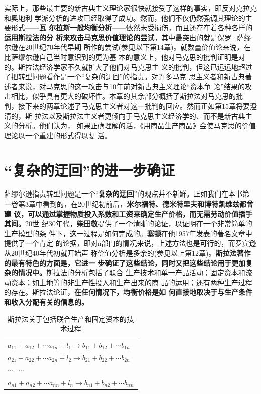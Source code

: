 实际上，那些最主要的新古典主义理论家很快就接受了这样的事实，即反对克拉克和奥地利
学派分析的进攻已经取得了成功。然而，他们不仅仍然强调其理论的主要形式——\textbf{瓦
  尔拉斯一般均衡分析}——依然未受损伤，而且还存在着各种各样的\textbf{运用斯拉法的分
  析来攻击马克思价值理论的尝试}，其中最突出的就是保罗·萨缪尔逊在20世纪70年代早期
所作的尝试(参见以下第14章)。就数量价值论来说，在比萨缪尔逊自己当时意识到的更为基
本的意义上，他对马克思的批判证明是对的。斯拉法经济学家不久就扩大了他们对马克思主
义的批判，但这已远远地超过了把转型问题看作是一个“复杂的迂回”的指责。对许多马克
思主义者和新古典著述者来说，对马克思的这一攻击与10年前对新古典主义理论“资本争
论”结果的攻击相比，似乎具有更大的破坏性。本章的其余部分概括了斯拉法对马克思的批
判，接下来的两章论述了马克思主义者对这一批判的回应。然而正如第15章将要澄清的，斯
拉法以及斯拉法主义者更倾向于马克思主义经济学的、而不是新古典主义的分析。他们认为，
如果正确理解的话，《用商品生产商品》会使马克思的价值理论以一个重建的形式得以复
活。

\section{“复杂的迂回”的进一步确证}

萨缪尔逊指责转型问题是一个“\textbf{复杂的迂回}”的观点并不新鲜。正如我们在本书第
一卷第3章中看到的，在20世纪初前后，\textbf{米尔福特、德米特里夫和博特凯维兹都曾建
  议，可以通过掌握物质投入系数和工资来确定生产价格，而无需劳动价值插手其间。}20世
纪30年代，\textbf{柴田敬}提供了一个清晰的论证，以证明在一个非常简单的生产模型的条
件下，这一过程是如何完成的。\textbf{塞顿}在他1957年发表的著名文章中提供了一个肯定
的论据，即对n部门的情况来说，上述方法也是可行的，而罗宾逊从20世纪40年代初就开始声
称价值分析是多余的(参见以上第12章)。\textbf{斯拉法著作的最有特色的方面是，它进一
  步确证了这些结论，同时又把这些结论用于更加复杂的情况中。}斯拉法的分析包括了联合
生产技术和单一产品活动；固定资本和流动资本；如土地等的非生产性投入和生产出来的商
品的运用；还有两种生产过程的存在。斯拉法论证，\textbf{在任何情况下，均衡价格是如
  何直接地取决于与生产条件和收入分配有关的信息的。}

\begin{table}[htbp]
\centering
\caption{斯拉法关于包括联合生产和固定资本的技术过程}
\label{t:Sraffa1}
\begin{tabular}{l}
  $\displaystyle a_{11}+a_{12}+ \cdots a_{1n}+l_{1} \to b_{11}+b_{12}+ \cdots b_{1n} $\\
  $\displaystyle a_{21}+a_{22}+ \cdots a_{2n}+l_{2} \to b_{21}+b_{22}+ \cdots b_{2n}$\\
  $\displaystyle \cdots \cdots \cdots$\\
  $\displaystyle a_{n1}+a_{n2}+ \cdots a_{nn}+l_{n} \to b_{n1}+b_{n2}+ \cdots b_{nn} $
\end{tabular}
\end{table}

